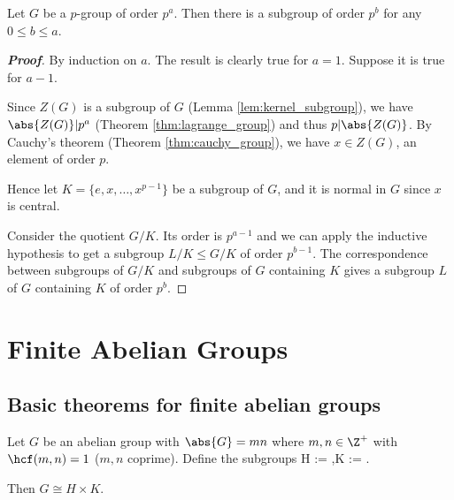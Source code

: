 



\begin{theorem}
Let $G$ be a $p$-group of order $p^a$. Then there is a subgroup of order $p^b$ for any $0 \leq b \leq a$.
\end{theorem}



\begin{proof}[\bf Proof]
By induction on $a$. The result is clearly true for $a = 1$. Suppose it is true for $a - 1$.

Since $Z(G)$ is a subgroup of $G$ (Lemma \ref{lem:kernel_subgroup}), we have $\abs{Z(G)}|p^a$ (Theorem \ref{thm:lagrange_group}) and thus $p |\abs{Z(G)}$. By Cauchy's theorem (Theorem \ref{thm:cauchy_group}), we have $x\in Z(G)$, an element of order $p$.

Hence let $K = \{e, x,\dots , x^{p-1}\}$ be a subgroup of $G$, and it is normal in $G$ since $x$ is central.

Consider the quotient $G/K$. Its order is $p^{a-1}$ and we can apply the inductive hypothesis to get a subgroup $L/K \leq G/K$ of order $p^{b-1}$. The correspondence between subgroups of $G/K$ and subgroups of $G$ containing $K$ gives a subgroup $L$ of $G$ containing $K$ of order $p^b$.
\end{proof}

\section{Finite Abelian Groups}

\subsection{Basic theorems for finite abelian groups}


\begin{lemma}\label{lem:coprime_cong_abelian_group}
Let $G$ be an abelian group with $\abs{G} = mn$ where $m,n\in \Z^+$ with $\hcf(m,n)=1$ ($m,n$ coprime). Define the subgroups
\be
H := ,\qquad K := .
\ee

Then $G\cong H\times K$.
\end{lemma}

